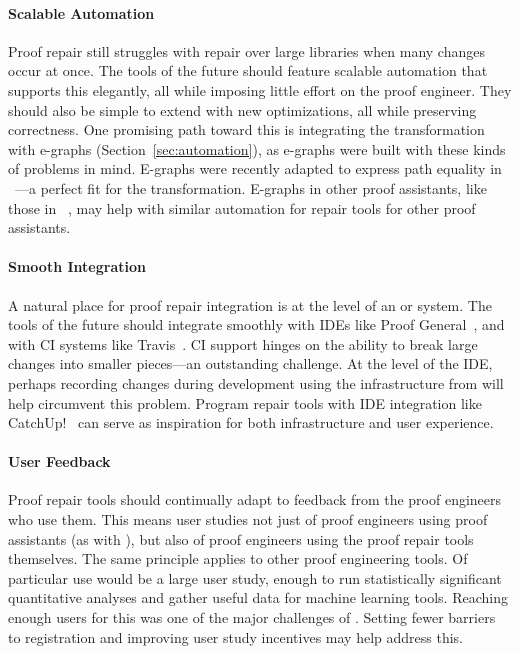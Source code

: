 \paragraph{Scalable Automation}
Proof repair still struggles with repair over large libraries when many changes occur at once.
The tools of the future should feature scalable automation that supports this elegantly,
all while imposing little effort on the proof engineer.
They should also be simple to extend with new optimizations, all while preserving correctness.
One promising path toward this is integrating the \toolnamec transformation with e-graphs (Section~\ref{sec:automation}),
as e-graphs were built with these kinds of problems in mind.
E-graphs were recently adapted to express path equality in ~\cite{egraph6}---a perfect fit for the \toolnamec transformation.
E-graphs in other proof assistants, like those in ~\cite{selsam:lean}, may help with similar automation for repair tools for other proof assistants.

\paragraph{Smooth Integration}
A natural place for proof repair integration is at the level of an  or  system.
The tools of the future should integrate smoothly with IDEs like Proof General~\cite{proofgeneral},
and with CI systems like Travis~\cite{travis}.
CI support hinges on the ability to break large changes into smaller pieces---an outstanding challenge.
At the level of the IDE, perhaps recording changes during development using the infrastructure from
 will help circumvent this problem.
Program repair tools with IDE integration like CatchUp!~\cite{Henkel:2005:CCR:1062455.1062512} can
serve as inspiration for both infrastructure and user experience.

\paragraph{User Feedback} 
Proof repair tools should continually adapt to feedback from the proof engineers who use them.
This means user studies not just of proof engineers using proof assistants (as with ),
but also of proof engineers using the proof repair tools themselves.
The same principle applies to other proof engineering tools.
Of particular use would be a large user study, enough to run statistically significant quantitative analyses
and gather useful data for machine learning tools.
Reaching enough users for this was one of the major challenges of .
Setting fewer barriers to registration and improving user study incentives may help address this.

